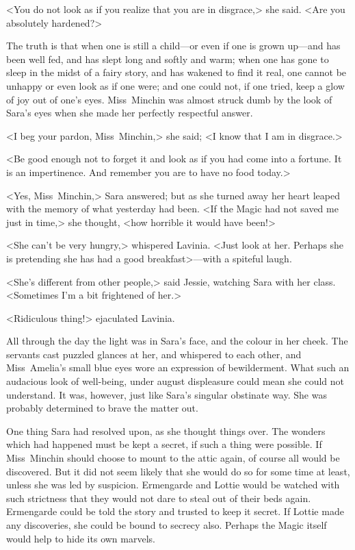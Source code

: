 <You do not look as if you realize that you are in disgrace,> she said. <Are you absolutely hardened?>

The truth is that when one is still a child—or even if one is grown up—and has been well fed, and has slept long and softly and warm; when one has gone to sleep in the midst of a fairy story, and has wakened to find it real, one cannot be unhappy or even look as if one were; and one could not, if one tried, keep a glow of joy out of one's eyes. Miss~Minchin was almost struck dumb by the look of Sara's eyes when she made her perfectly respectful answer.

<I beg your pardon, Miss~Minchin,> she said; <I know that I am in disgrace.>

<Be good enough not to forget it and look as if you had come into a fortune. It is an impertinence. And remember you are to have no food today.>

<Yes, Miss~Minchin,> Sara answered; but as she turned away her heart leaped with the memory of what yesterday had been. <If the Magic had not saved me just in time,> she thought, <how horrible it would have been!>

<She can't be very hungry,> whispered Lavinia. <Just look at her. Perhaps she is pretending she has had a good breakfast>—with a spiteful laugh.

<She's different from other people,> said Jessie, watching Sara with her class. <Sometimes I'm a bit frightened of her.>

<Ridiculous thing!> ejaculated Lavinia.

All through the day the light was in Sara's face, and the colour in her cheek. The servants cast puzzled glances at her, and whispered to each other, and Miss~Amelia's small blue eyes wore an expression of bewilderment. What such an audacious look of well-being, under august displeasure could mean she could not understand. It was, however, just like Sara's singular obstinate way. She was probably determined to brave the matter out.

One thing Sara had resolved upon, as she thought things over. The wonders which had happened must be kept a secret, if such a thing were possible. If Miss~Minchin should choose to mount to the attic again, of course all would be discovered. But it did not seem likely that she would do so for some time at least, unless she was led by suspicion. Ermengarde and Lottie would be watched with such strictness that they would not dare to steal out of their beds again. Ermengarde could be told the story and trusted to keep it secret. If Lottie made any discoveries, she could be bound to secrecy also. Perhaps the Magic itself would help to hide its own marvels.

